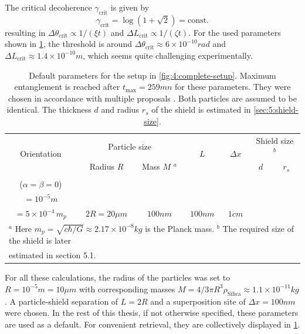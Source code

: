 The critical decoherence $\gamma_\mathrm{crit}$ is given by
\begin{equation}\label{eq:4:critical-point}
  \gamma_\mathrm{crit} = \log(1 + \sqrt{2}) = \mathrm{const.}
\end{equation}
resulting in $\Delta\theta_\mathrm{crit} \propto 1/(\xi t)$ and $\Delta L_\mathrm{crit} \propto 1/(\zeta t)$. 
For the used parameters shown in \cref{tab:paramters}, the threshold is around $\Delta \theta_\mathrm{crit} \approx 6 \times 10^{-10} \si{rad}$ and $\Delta L_\mathrm{crit} \approx 1.4 \times 10^{-10} \si{m}$, which seems quite challenging experimentally.
\begin{table}[!t]
  \centering
  \begin{adjustbox}{max width=\textwidth}
    \begin{tabularx}{\textwidth}{c c c c c c c}
      \toprule
      \multirow{2}{*}{Orientation} & \multicolumn{2}{c}{Particle size} & \multirow{2}{*}{$L$} & \multirow{2}{*}{$\Delta x$} & \multicolumn{2}{c}{Shield size $^b$} \\ \cline{2-3} \cline{6-7}
      & Radius $R$ & Mass $M$ $^a$ & & & $d$ & $r_s$\\
      \midrule
      \begin{tabular}{@{}c@{}}Parallel \\ ($\alpha=\beta=0$) \end{tabular} & \begin{tabular}{@{}c@{}}$10\si{\mu m}$ \\ $=10^{-5}\si{m}$\end{tabular} & \begin{tabular}{@{}c@{}}$\approx 10^{-11}\si{kg}$ \\ $=5\times 10^{-4} \, m_p$\end{tabular} & $2R=20\si{\mu m}$ & $100\si{nm}$ & $100\si{nm}$ & $1\si{cm}$ \\
      \bottomrule
      \multicolumn{7}{l}{\footnotesize $^a$ Here $m_p = \sqrt{c\hbar/G}\approx 2.17\times 10^{-8}\si{kg}$ is the Planck mass. $^b$ The required size of the shield is later} \\[-4pt]
      \multicolumn{7}{l}{\footnotesize estimated in section 5.1.} \\[5pt]
    \end{tabularx}
  \end{adjustbox}
  \caption{Default parameters for the setup in \cref{fig:4:complete-setup}. Maximum entanglement is reached after $t_\mathrm{max} = 259\si{mn}$ for these parameters. They were chosen in accordance with multiple proposals \cite{Aspelmeyer_2024,Rijavec_2021}. Both particles are assumed to be identical. The thickness $d$ and radius $r_s$ of the shield is estimated in \cref{sec:5:shield-size}.}
  \label{tab:paramters}
\end{table}
For all these calculations, the radius of the particles was set to $R=10^{-5}\si{m} = 10\si{\mu m}$ with corresponding masses $M=4/3 \pi R^3 \rho_\mathrm{Silica} \approx 1.1\times 10^{-11}\si{kg}$.
A particle-shield separation of $L=2R$ and a superposition site of $\Delta x = 100\si{nm}$ were chosen. In the rest of this thesis, if not otherwise specified, these parameters are used as a default.
For convenient retrieval, they are collectively displayed in \cref{tab:paramters}.

